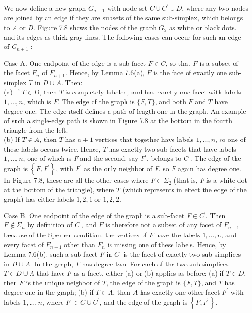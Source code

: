 \documentclass[12pt]{article}
\begin{document}
We now define a new graph $G_{n+1}$ with node set $C \cup C^{\prime} \cup D$, where any two nodes are joined by an edge if they are subsets of the same sub-simplex, which belongs to $A$ or $D$. Figure 7.8 shows the nodes of the graph $G_{3}$ as white or black dots, and its edges as thick gray lines. The following cases can occur for such an edge of $G_{n+1}$ :

Case A. One endpoint of the edge is a sub-facet $F \in C$, so that $F$ is a subset of the facet $F_{n}$ of $F_{n+1}$. Hence, by Lemma 7.6(a), $F$ is the face of exactly one sub-simplex $T$ in $D \cup A$. Then:\\
(a) If $T \in D$, then $T$ is completely labeled, and has exactly one facet with labels $1, \ldots, n$, which is $F$. The edge of the graph is $\{F, T\}$, and both $F$ and $T$ have degree one. The edge itself defines a path of length one in the graph. An example of such a single-edge path is shown in Figure 7.8 at the bottom in the fourth triangle from the left.\\
(b) If $T \in A$, then $T$ has $n+1$ vertices that together have labels $1, \ldots, n$, so one of these labels occurs twice. Hence, $T$ has exactly two sub-facets that have labels $1, \ldots, n$, one of which is $F$ and the second, say $F^{\prime}$, belongs to $C^{\prime}$. The edge of the graph is $\left\{F, F^{\prime}\right\}$, with $F^{\prime}$ as the only neighbor of $F$, so $F$ again has degree one. In Figure 7.8, these are all the other cases where $F \in \Sigma_{2}$ (that is, $F$ is a white dot at the bottom of the triangle), where $T$ (which represents in effect the edge of the graph) has either labels $1,2,1$ or $1,2,2$.

Case B. One endpoint of the edge of the graph is a sub-facet $F \in C^{\prime}$. Then $F \notin \Sigma_{n}$ by definition of $C^{\prime}$, and $F$ is therefore not a subset of any facet of $F_{n+1}$ because of the Sperner condition: the vertices of $F$ have the labels $1, \ldots, n$, and every facet of $F_{n+1}$ other than $F_{n}$ is missing one of these labels. Hence, by Lemma 7.6(b), such a sub-facet $F$ in $C^{\prime}$ is the facet of exactly two sub-simplices in $D \cup A$. In the graph, $F$ has degree two. For each of the two sub-simplices $T \in D \cup A$ that have $F$ as a facet, either (a) or (b) applies as before: (a) if $T \in D$, then $F$ is the unique neighbor of $T$, the edge of the graph is $\{F, T\}$, and $T$ has degree one in the graph; (b) if $T \in A$, then $A$ has exactly one other facet $F^{\prime}$ with labels $1, \ldots, n$, where $F^{\prime} \in C \cup C^{\prime}$, and the edge of the graph is $\left\{F, F^{\prime}\right\}$.
\end{document}
